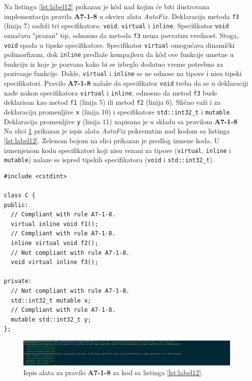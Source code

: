 \documentclass[12pt,oneside]{memoir}
\begin{document}
Na listingu \ref{lst:label12} prikazan je k\^{o}d nad kojim \'{c}e biti ilustrovana implementacija pravila \textbf{A7-1-8} u okviru alata \textit{AutoFix}. Deklaracija metoda \texttt{f3} (linija 7) sadr\v{z}i tri specifikatora: \texttt{void}, \texttt{virtual} i \texttt{inline}.
Specifikator \texttt{void} ozna\v{c}ava "prazan" tip, odnosno da metoda \texttt{f3} nema povratnu vrednost. Stoga, \texttt{void} spada u tipske specifikatore.
Specifikator \texttt{virtual} omogu\'{c}ava dinami\v{c}ki polimorfizam, dok \texttt{inline} predla\v{z}e kompajleru da k\^{o}d ove funkcije umetne u funkciju iz koje je pozvana
kako bi se izbeglo dodatno vreme potrebno za pozivanje funkcije. Dakle, \texttt{virtual} i \texttt{inline} se ne odnose na tipove i nisu tipski specifikatori. Pravilo
\textbf{A7-1-8} nala\v{z}e da specifikator \texttt{void} treba da se u deklaraciji nađe nakon specifikatora \texttt{virtual} i \texttt{inline}, odnosno da metod \texttt{f3} bude
deklarisan kao metod \texttt{f1} (linija 5) ili metod \texttt{f2} (linija 6). Sli\v{c}no va\v{z}i i za deklaraciju promenljive \texttt{x} (linija 10) i specifikatore \texttt{std::int32\_t} i \texttt{mutable}. Deklaracija promenljive \texttt{y} (linija 11) napisana je u skladu sa pravilom \textbf{A7-1-8}\\ 

Na slici \ref{fig:A7-1-8} prikazan je ispis alata \textit{AutoFix} pokrenutim nad kodom sa listinga \ref{lst:label12}. Zelenom bojom na slici
prikazan je predlog izmene koda. U izmenjenom kodu specifikatori koji nisu vezani za tipove (\texttt{virtual}, \texttt{inline} i \texttt{mutable}) nalaze se
ispred tipskih specifikatora (\texttt{void} i \texttt{std::int32\_t}).

\begin{lstlisting}[style=customc, caption={Primer koda nad kojim je pokrenut alat \textit{AutoFix} za pravilo \textbf{A7-1-8}. Ispis alata \textit{AutoFix} nakon pokretanja nad ovim kodom prikazan je na slici \ref{fig:A7-1-8}.}, label=lst:label12]
#include <cstdint>

class C {
public:
  // Compliant with rule A7-1-8.
  virtual inline void f1();
  // Compliant with rule A7-1-8.
  inline virtual void f2();
  // Not compliant with rule A7-1-8.
  void virtual inline f3();

private:
  // Not compliant with rule A7-1-8.
  std::int32_t mutable x;
  // Compliant with rule A7-1-8.
  mutable std::int32_t y;
};
\end{lstlisting}

\begin{figure}[!h]
\begin{center}
\includegraphics[scale=0.3]{A7-1-8.png}
\end{center}
\caption{Ispis alata za pravilo \textbf{A7-1-8} za kod sa listinga \ref{lst:label12}.}
\label{fig:A7-1-8}
\end{figure}
\end{document}
